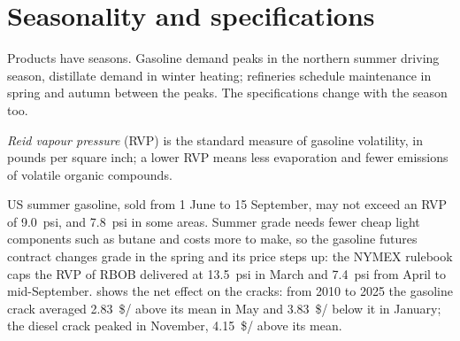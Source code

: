 \begin{omfigure}

\label{fig:m3:refined-products-and-cracks:arb}
\end{omfigure}

\section{Seasonality and specifications}

Products have seasons. Gasoline demand peaks in the northern summer driving season,
distillate demand in winter heating; refineries schedule maintenance in spring and
autumn between the peaks. The specifications change with the season too.

\begin{definition}\label{def:m3:refined-products-and-cracks:rvp}
\emph{Reid vapour pressure} (RVP) is the standard measure
of gasoline volatility, in pounds per square inch; a lower RVP means less evaporation
and fewer emissions of volatile organic compounds.
\end{definition}

US summer gasoline, sold from 1 June to 15 September, may not exceed an RVP of
\qty{9.0}{psi}, and \qty{7.8}{psi} in some areas. Summer grade needs fewer cheap light
components such as butane and costs more to make, so the gasoline futures contract
changes grade in the spring and its price steps up: the NYMEX rulebook caps the RVP of RBOB delivered at \qty{13.5}{psi} in March and
\qty{7.4}{psi} from April to mid-September.
 shows the net effect on the cracks:
from 2010 to 2025 the gasoline crack averaged \qty{2.83}{\$/\barrel} above its mean in
May and \qty{3.83}{\$/\barrel} below it in January; the diesel crack peaked in
November, \qty{4.15}{\$/\barrel} above its mean.

